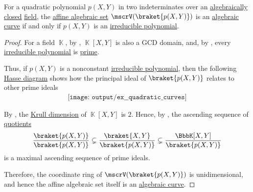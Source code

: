 \begin{proposition}\label{thm:quadratic_polynomial_irreducibility}
  For a quadratic polynomial \( p(X, Y) \) in two indeterminates over an \hyperref[def:algebraically_closed_field]{algebraically closed} \hyperref[def:field]{field}, the \hyperref[def:affine_algebraic_set]{affine algebraic set} \( \mscrV(\braket{ p(X, Y) }) \) is an \hyperref[def:affine_algebraic_set/variety]{algebraic curve} if and only if \( p(X, Y) \) is an \hyperref[def:domain_divisibility/irreducible]{irreducible polynomial}.
\end{proposition}
\begin{proof}
  For a field \( \BbbK \), by , \( \BbbK[X, Y] \) is also a GCD domain, and, by , every \hyperref[def:domain_divisibility/irreducible]{irreducible polynomial} is \hyperref[def:domain_divisibility/prime]{prime}.

  Thus, if \( p(X, Y) \) is a nonconstant \hyperref[def:domain_divisibility/irreducible]{irreducible polynomial}, then the following \hyperref[def:hasse_diagram]{Hasse diagram} shows how the principal ideal of \( \braket{ p(X, Y) } \) relates to other prime ideals
  \begin{equation*}
    \begin{aligned}
      \texttt{[image: output/ex\_\_quadratic\_curves]}
    \end{aligned}
  \end{equation*}

  By , the \hyperref[def:krull_dimension]{Krull dimension} of \( \BbbK[X, Y] \) is \( 2 \). Hence, by , the ascending sequence of \hyperref[def:ring/quotient]{quotients}
  \begin{equation*}
    \frac {\braket{ p(X, Y) }} {\braket{ p(X, Y) }} \subsetneq \frac {\braket{ X, Y }} {\braket{ p(X, Y) }} \subsetneq \frac {\BbbK[X, Y]} {\braket{ p(X, Y) }}
  \end{equation*}
  is a maximal ascending sequence of prime ideals.

  Therefore, the coordinate ring of \( \mscrV(\braket{ p(X, Y) }) \) is unidimensional, and hence the affine algebraic set itself is an \hyperref[def:affine_algebraic_set/curve]{algebraic curve}.
\end{proof}

